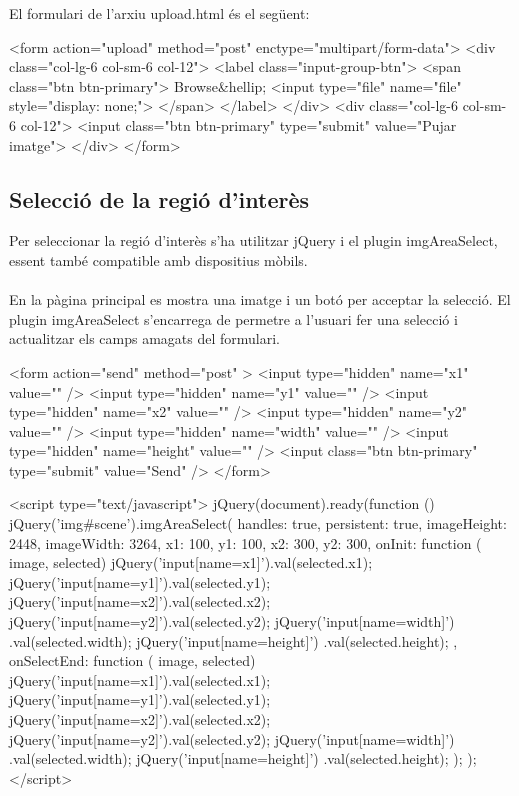 El formulari de l'arxiu upload.html és el següent:\\

		\begin{txt}
<form action="upload" method="post" 
	enctype="multipart/form-data">
	<div class="col-lg-6 col-sm-6 col-12">
		<label class="input-group-btn">
			<span class="btn btn-primary">
				Browse&hellip; <input type="file" 
					name="file" style="display: none;">
			</span>
		</label>
	</div>
	<div class="col-lg-6 col-sm-6 col-12">
		<input class="btn btn-primary" type="submit"
			value="Pujar imatge">
	</div>
</form>
		\end{txt}

	\subsection{Selecció de la regió d'interès}
		Per seleccionar la regió d'interès s'ha utilitzar jQuery i el plugin imgAreaSelect, essent també compatible amb dispositius mòbils.\\\\
		En la pàgina principal es mostra una imatge i un botó per acceptar la selecció. El plugin imgAreaSelect s'encarrega de permetre a l'usuari fer una selecció i actualitzar els camps
		amagats del formulari.\\
		\begin{txt}
<form action="send" method="post" >
	<input type="hidden" name="x1" value="" />
	<input type="hidden" name="y1" value="" />
	<input type="hidden" name="x2" value="" />
	<input type="hidden" name="y2" value="" />
	<input type="hidden" name="width" value="" />
	<input type="hidden" name="height" value="" />
	<input class="btn btn-primary" type="submit"
		value="Send" />
</form>

<script type="text/javascript">
	jQuery(document).ready(function () {
		jQuery('img#scene').imgAreaSelect({
			handles: true,
			persistent: true,
			imageHeight: 2448,
			imageWidth: 3264,
			x1: 100, y1: 100, x2: 300, y2: 300,
			onInit: function ( image, selected) {
				jQuery('input[name=x1]').val(selected.x1);
				jQuery('input[name=y1]').val(selected.y1);
				jQuery('input[name=x2]').val(selected.x2);
				jQuery('input[name=y2]').val(selected.y2);
				jQuery('input[name=width]')
					.val(selected.width);
				jQuery('input[name=height]')
					.val(selected.height);
			},
			onSelectEnd: function ( image, selected) {
				jQuery('input[name=x1]').val(selected.x1);
				jQuery('input[name=y1]').val(selected.y1);
				jQuery('input[name=x2]').val(selected.x2);
				jQuery('input[name=y2]').val(selected.y2);
				jQuery('input[name=width]')
					.val(selected.width);
				jQuery('input[name=height]')
					.val(selected.height);
			}
		});
	});
 </script>
		\end{txt}

